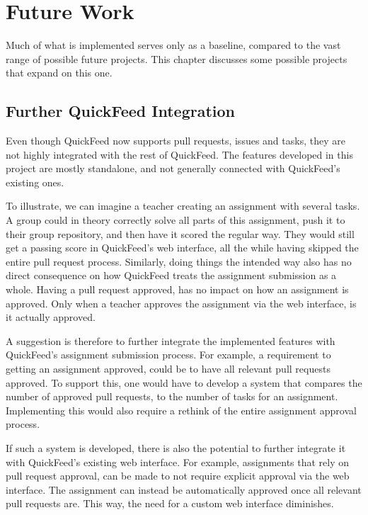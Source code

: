
\chapter{Future Work}
\label{ch:future-work}

Much of what is implemented serves only as a baseline, compared to the vast range of possible future projects.
This chapter discusses some possible projects that expand on this one.

\section{Further QuickFeed Integration}

Even though QuickFeed now supports pull requests, issues and tasks, they are not highly integrated with the rest of QuickFeed.
The features developed in this project are mostly standalone, and not generally connected with QuickFeed's existing ones.

To illustrate, we can imagine a teacher creating an assignment with several tasks.
A group could in theory correctly solve all parts of this assignment, push it to their group repository, and then have it scored the regular way.
They would still get a passing score in QuickFeed's web interface, all the while having skipped the entire pull request process.
Similarly, doing things the intended way also has no direct consequence on how QuickFeed treats the assignment submission as a whole.
Having a pull request approved, has no impact on how an assignment is approved.
Only when a teacher approves the assignment via the web interface, is it actually approved.

A suggestion is therefore to further integrate the implemented features with QuickFeed's assignment submission process.
For example, a requirement to getting an assignment approved, could be to have all relevant pull requests approved.
To support this, one would have to develop a system that compares the number of approved pull requests, to the number of tasks for an assignment.
Implementing this would also require a rethink of the entire assignment approval process.

If such a system is developed, there is also the potential to further integrate it with QuickFeed's existing web interface.
For example, assignments that rely on pull request approval, can be made to not require explicit approval via the web interface.
The assignment can instead be automatically approved once all relevant pull requests are.
This way, the need for a custom web interface diminishes.

